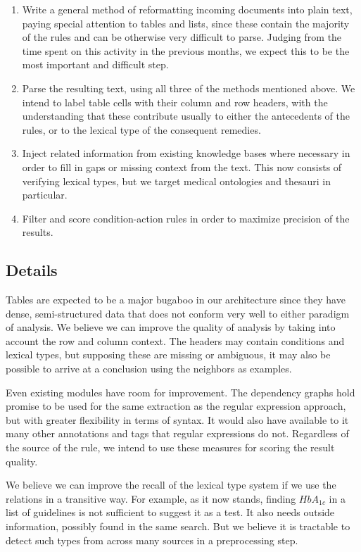 \documentclass[12pt,letterpaper]{article}
\begin{document}
\begin{enumerate}
\item Write a general method of reformatting incoming documents into plain text, paying special attention to tables and lists, since these contain the majority of the rules and can be otherwise very difficult to parse. Judging from the time spent on this activity in the previous months, we expect this to be the most important and difficult step.
\item Parse the resulting text, using all three of the methods mentioned above. We intend to label table cells with their column and row headers, with the understanding that these contribute usually to either the antecedents of the rules, or to the lexical type of the consequent remedies. 
\item Inject related information from existing knowledge bases where necessary in order to fill in gaps or missing context from the text. This now consists of verifying lexical types, but we target medical ontologies and thesauri in particular.
\item Filter and score condition-action rules in order to maximize precision of the results.
\end{enumerate}

\subsection*{Details}
Tables are expected to be a major bugaboo in our architecture since they have dense, semi-structured data that does not conform very well to either paradigm of analysis. We believe we can improve the quality of analysis by taking into account the row and column context. The headers may contain conditions and lexical types, but supposing these are missing or ambiguous, it may also be possible to arrive at a conclusion using the neighbors as examples.

Even existing modules have room for improvement. The dependency graphs hold promise to be used for the same extraction as the regular expression approach, but with greater flexibility in terms of syntax. It would also have available to it many other annotations and tags that regular expressions do not. Regardless of the source of the rule, we intend to use these measures for scoring the result quality.

We believe we can improve the recall of the lexical type system if we use the relations in a transitive way. For example, as it now stands, finding $HbA_{1c}$ in a list of guidelines is not sufficient to suggest it as a test. It also needs outside information, possibly found in the same search. But we believe it is tractable to detect such types from across many sources in a preprocessing step. 
\end{document}
